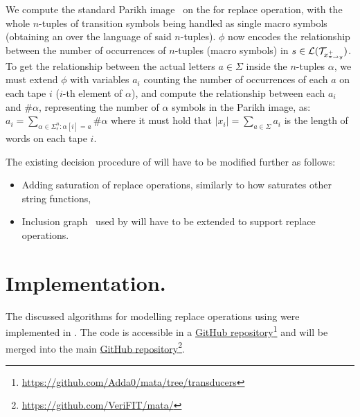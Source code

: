 We compute the standard Parikh image~\cite{DBLP:conf/icalp/SeidlSMH04} on the \nft for replace operation, with the whole $n$-tuples of transition symbols being handled as single macro symbols (obtaining an \nfa over the language of said $n$-tuples).
$\phi$ now encodes the relationship between the number of occurrences of $n$-tuples (macro symbols) in $s \in \mathcal{L}(\mathcal{T}_{x^{+}_{\pi \rightarrow y}})$.
To get the relationship between the actual letters $a \in \Sigma$ inside the $n$-tuples $\alpha$, we must extend $\phi$ with variables $a_i$ counting the number of occurrences of each $a$ on each tape $i$ ($i$-th element of $\alpha$), and compute the relationship between each $a_i$ and $\#\alpha$, representing the number of $\alpha$ symbols in the Parikh image, as: $a_i = \sum_{\alpha \in \Sigma^n_{\epsilon}: \alpha[i] = a} \#\alpha$ where it must hold that $|x_i| = \sum_{a \in \Sigma} a_i $ is the length of words on each tape $i$.

The existing decision procedure of \noodler will have to be modified further as follows:
\begin{itemize}
  \item Adding saturation of replace operations, similarly to how \noodler saturates other string functions,
  \item Inclusion graph~\cite{fm23_equations_synergy_regular_constraints_DBLP:conf/fm/BlahoudekCCHHLS23} used by \noodler will have to be extended to support replace operations.
\end{itemize}

\section{Implementation.}

The discussed algorithms for modelling replace operations using \nfts were implemented in \mata.
The code is accessible in a \href{https://github.com/Adda0/mata/tree/transducers}{GitHub repository}\footnote{\url{https://github.com/Adda0/mata/tree/transducers}} and will be merged into the main \mata \href{https://github.com/VeriFIT/mata/}{GitHub repository}\footnote{\url{https://github.com/VeriFIT/mata/}}.

